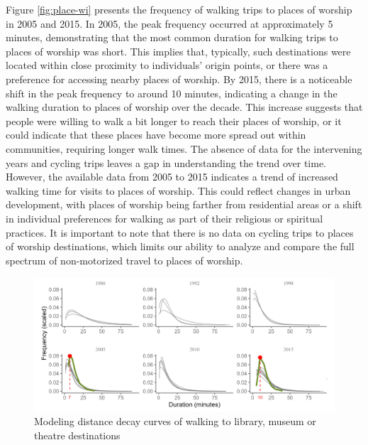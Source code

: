 \documentclass[12pt,twoside]{reedthesis}
\begin{document}
Figure \ref{fig:place-wi} presents the frequency of walking trips to places of worship in 2005 and 2015. In 2005, the peak frequency occurred at approximately 5 minutes, demonstrating that the most common duration for walking trips to places of worship was short. This implies that, typically, such destinations were located within close proximity to individuals' origin points, or there was a preference for accessing nearby places of worship. By 2015, there is a noticeable shift in the peak frequency to around 10 minutes, indicating a change in the walking duration to places of worship over the decade. This increase suggests that people were willing to walk a bit longer to reach their places of worship, or it could indicate that these places have become more spread out within communities, requiring longer walk times. The absence of data for the intervening years and cycling trips leaves a gap in understanding the trend over time. However, the available data from 2005 to 2015 indicates a trend of increased walking time for visits to places of worship. This could reflect changes in urban development, with places of worship being farther from residential areas or a shift in individual preferences for walking as part of their religious or spiritual practices. It is important to note that there is no data on cycling trips to places of worship destinations, which limits our ability to analyze and compare the full spectrum of non-motorized travel to places of worship.

\newpage
\thispagestyle{empty}
\begin{landscape}
\begin{figure}

{\centering \includegraphics[width=0.9\linewidth]{library-wi} 

}

\caption{Modeling distance decay curves of walking to library, museum or theatre destinations}\label{fig:library-wi}
\end{figure}
\end{landscape}
\clearpage
\end{document}
